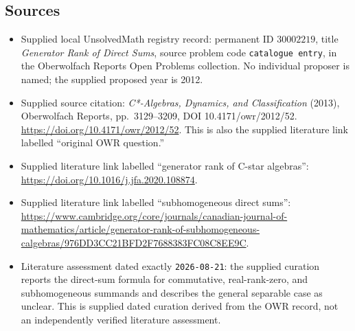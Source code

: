\documentclass[11pt]{article}
\begin{document}
\subsection{Sources}
\begin{itemize}
\item Supplied local UnsolvedMath registry record: permanent ID \(30002219\), title \emph{Generator Rank of Direct Sums}, source problem code \texttt{catalogue entry}, in the Oberwolfach Reports Open Problems collection. No individual proposer is named; the supplied proposed year is 2012.
\item Supplied source citation: \emph{C*-Algebras, Dynamics, and Classification} (2013), Oberwolfach Reports, pp.\ 3129--3209, DOI 10.4171/owr/2012/52. \url{https://doi.org/10.4171/owr/2012/52}. This is also the supplied literature link labelled ``original OWR question.''
\item Supplied literature link labelled ``generator rank of C-star algebras'': \url{https://doi.org/10.1016/j.jfa.2020.108874}.
\item Supplied literature link labelled ``subhomogeneous direct sums'': \url{https://www.cambridge.org/core/journals/canadian-journal-of-mathematics/article/generator-rank-of-subhomogeneous-calgebras/976DD3CC21BFD2F7688383FC08C8EE9C}.
\item Literature assessment dated exactly \texttt{2026-08-21}: the supplied curation reports the direct-sum formula for commutative, real-rank-zero, and subhomogeneous summands and describes the general separable case as unclear. This is supplied dated curation derived from the OWR record, not an independently verified literature assessment.
\end{itemize}
\end{document}
